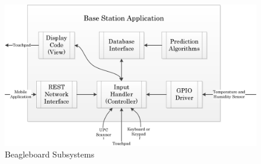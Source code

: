 \documentclass[11pt]{article} %
\begin{document}
\begin{figure}[h!]
\vspace{0.5cm}
\begin{center}
\includegraphics[scale=0.8]{../Graphics/BaseStation}
\caption{Beagleboard Subsystems}
\label{fig:basecode}
\end{center}
\end{figure}
\newline \quad \newline
\end{document}
